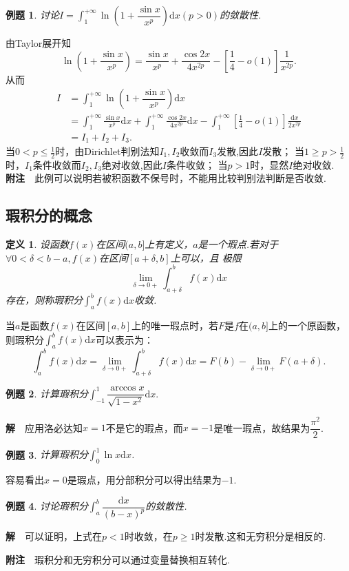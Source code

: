 \documentclass[UTF8]{article}
\newcommand{\dx}{\mathrm{d}x}
\newcommand{\jie}{\textbf{解}$\quad$}
\newcommand{\fz}{\textbf{附注}$\quad$}
\newtheorem{dfn}{\hspace{2em}定义}[section]
\newtheorem{exa}{\hspace{2em}例题}[section]
\begin{document}
\begin{exa}
  讨论$I=\displaystyle\int_1^{+\infty}\ln\left(1+\dfrac{\sin x}{x^p}\right)\dx(p>0)$的敛散性.
\end{exa}
由Taylor展开知
$$\ln(1+\frac{\sin x}{x^p})=\frac{\sin x}{x^p}+\frac{\cos2x}{4x^{2p}}-[\frac{1}{4}-o(1)]\frac{1}{x^{2p}}.$$
从而
\begin{align*}
  I&=\int_1^{+\infty}\ln\left(1+\dfrac{\sin x}{x^p}\right)\dx\\
  &=\int_1^{+\infty}\frac{\sin x}{x^p}\dx+\int_1^{+\infty}\frac{\cos2x}{4x^{2p}}\dx-
  \int_1^{+\infty}[\frac{1}{4}-o(1)]\frac{\dx}{2x^{2p}}\\
  &=I_1+I_2+I_3.
\end{align*}
当$0<p\le\frac{1}{2}$时，由Dirichlet判别法知$I_1,I_2$收敛而$I_3$发散,因此$I$发散；
当$1\ge p>\frac{1}{2}$时，$I_1$条件收敛而$I_2,I_3$绝对收敛,因此$I$条件收敛；
当$p>1$时，显然$I$绝对收敛.\\
\fz 此例可以说明若被积函数不保号时，不能用比较判别法判断是否收敛.
\subsection{瑕积分的概念}
\begin{dfn}
  设函数$f(x)$在区间$(a,b]$上有定义，$a$是一个瑕点.若对于$\forall 0<\delta<b-a,f(x)$在区间$[a+\delta,b]$上可以，且
  极限$$\lim_{\delta\to0+}\int_{a+\delta}^bf(x)\dx$$存在，则称瑕积分$\displaystyle\int_a^bf(x)\dx$收敛.
\end{dfn}
当$a$是函数$f(x)$在区间$[a,b]$上的唯一瑕点时，若$F$是$f$在$(a,b]$上的一个原函数，则瑕积分$\int_a^bf(x)\dx$可以表示为：
$$\int_a^bf(x)\dx=\lim_{\delta\to0+}\int_{a+\delta}^bf(x)\dx=F(b)-\lim_{\delta\to0+}F(a+\delta).$$
\begin{exa}
  计算瑕积分$\displaystyle\int_{-1}^1\dfrac{\arccos x}{\sqrt{1-x^2}}\dx.$
\end{exa}
\jie 应用洛必达知$x=1$不是它的瑕点，而$x=-1$是唯一瑕点，故结果为$\dfrac{\pi^2}{2}$.
\begin{exa}
  计算瑕积分$\displaystyle\int_0^1\ln x\dx$.
\end{exa}
容易看出$x=0$是瑕点，用分部积分可以得出结果为$-1$.
\begin{exa}
  讨论瑕积分$\displaystyle\int_a^b\dfrac{\dx}{(b-x)^p}$的敛散性.
\end{exa}
\jie 可以证明，上式在$p<1$时收敛，在$p\ge1$时发散.这和无穷积分是相反的.

\fz 瑕积分和无穷积分可以通过变量替换相互转化.
\end{document}
